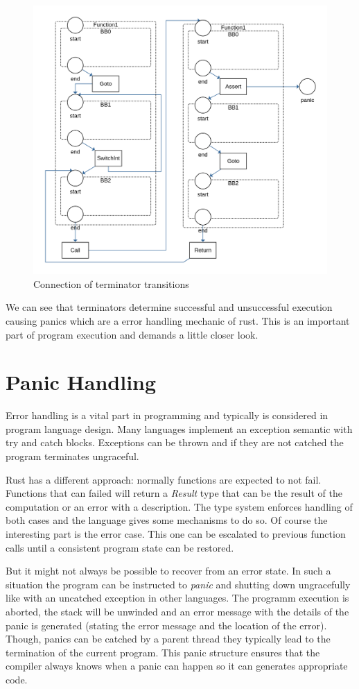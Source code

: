 \begin{figure}
    \centering
    \includegraphics[width=.9\textwidth]{../diagrams/TerminatorsNet.png}
    \caption{Connection of terminator transitions}
    \label{terminators_net}
\end{figure}

We can see that terminators determine successful and unsuccessful execution causing panics which are a error handling mechanic of rust.
This is an important part of program execution and demands a little closer look.

\section{Panic Handling}
Error handling is a vital part in programming and typically is considered in program language design.
Many languages implement an exception semantic with try and catch blocks.
Exceptions can be thrown and if they are not catched the program terminates ungraceful.

Rust has a different approach: normally functions are expected to not fail.
Functions that can failed will return a \textit{Result} type that can be the result of the computation or an error with a description.
The type system enforces handling of both cases and the language gives some mechanisms to do so.
Of course the interesting part is the error case.
This one can be escalated to previous function calls until a consistent program state can be restored.

But it might not always be possible to recover from an error state.
In such a situation the program can be instructed to \textit{panic} and shutting down ungracefully like with an uncatched exception in other languages.
The programm execution is aborted, the stack will be unwinded and an error message with the details of the panic is generated (stating the error message and the location of the error).
Though, panics can be catched by a parent thread they typically lead to the termination of the current program.
This panic structure ensures that the compiler always knows when a panic can happen so it can generates appropriate code.

